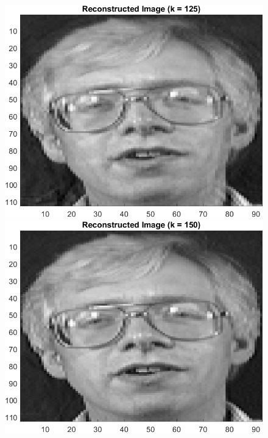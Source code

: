 \documentclass{article}
\begin{document}
\begin{figure}[!htb]
    \centering
    \begin{minipage}[b]{0.3\textwidth}
        \includegraphics[width=\textwidth]{orl_recon_125.png}
    \end{minipage}
    \begin{minipage}[b]{0.3\textwidth}
        \includegraphics[width=\textwidth]{orl_recon_150.png}
    \end{minipage}

\end{figure}
\end{document}
